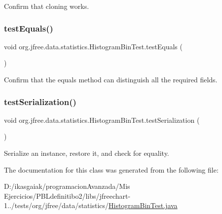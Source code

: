 Confirm that cloning works. \mbox{\label{classorg_1_1jfree_1_1data_1_1statistics_1_1_histogram_bin_test_a7e1f6bc9d64455a2db7a6c4457c7e6cb}} 
\subsubsection{\texorpdfstring{test\+Equals()}{testEquals()}}
{\footnotesize\ttfamily void org.\+jfree.\+data.\+statistics.\+Histogram\+Bin\+Test.\+test\+Equals (\begin{DoxyParamCaption}{ }\end{DoxyParamCaption})}

Confirm that the equals method can distinguish all the required fields. \mbox{\label{classorg_1_1jfree_1_1data_1_1statistics_1_1_histogram_bin_test_a0f312d6d8e7cc1f5b3af86bf56d4ad75}} 
\subsubsection{\texorpdfstring{test\+Serialization()}{testSerialization()}}
{\footnotesize\ttfamily void org.\+jfree.\+data.\+statistics.\+Histogram\+Bin\+Test.\+test\+Serialization (\begin{DoxyParamCaption}{ }\end{DoxyParamCaption})}

Serialize an instance, restore it, and check for equality. 

The documentation for this class was generated from the following file\+:\begin{DoxyCompactItemize}
\item 
D\+:/ikasgaiak/programacion\+Avanzada/\+Mis Ejercicios/\+P\+B\+Ldefinitibo2/libs/jfreechart-\/1../tests/org/jfree/data/statistics/\mbox{\hyperlink{_histogram_bin_test_8java}{Histogram\+Bin\+Test.\+java}}\end{DoxyCompactItemize}
